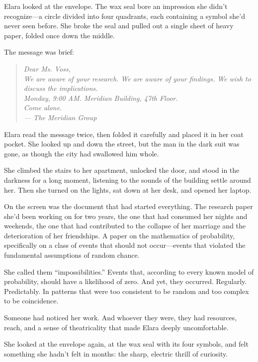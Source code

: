 \documentclass[
    language=english,
    doctype=novel,
    institution=none,
]{../../omnilatex}
\begin{document}
Elara looked at the envelope. The wax seal bore an impression she didn't recognize---a circle divided into four quadrants, each containing a symbol she'd never seen before. She broke the seal and pulled out a single sheet of heavy paper, folded once down the middle.

The message was brief:

\begin{quote}
\textit{Dear Ms. Voss,}\\[0.3cm]
\textit{We are aware of your research. We are aware of your findings. We wish to discuss the implications.}\\[0.3cm]
\textit{Monday, 9:00 AM. Meridian Building, 47th Floor.}\\[0.3cm]
\textit{Come alone.}\\[0.3cm]
\textit{--- The Meridian Group}
\end{quote}

Elara read the message twice, then folded it carefully and placed it in her coat pocket. She looked up and down the street, but the man in the dark suit was gone, as though the city had swallowed him whole.

She climbed the stairs to her apartment, unlocked the door, and stood in the darkness for a long moment, listening to the sounds of the building settle around her. Then she turned on the lights, sat down at her desk, and opened her laptop.

On the screen was the document that had started everything. The research paper she'd been working on for two years, the one that had consumed her nights and weekends, the one that had contributed to the collapse of her marriage and the deterioration of her friendships. A paper on the mathematics of probability, specifically on a class of events that should not occur---events that violated the fundamental assumptions of random chance.

She called them ``impossibilities.'' Events that, according to every known model of probability, should have a likelihood of zero. And yet, they occurred. Regularly. Predictably. In patterns that were too consistent to be random and too complex to be coincidence.

Someone had noticed her work. And whoever they were, they had resources, reach, and a sense of theatricality that made Elara deeply uncomfortable.

She looked at the envelope again, at the wax seal with its four symbols, and felt something she hadn't felt in months: the sharp, electric thrill of curiosity.
\end{document}
